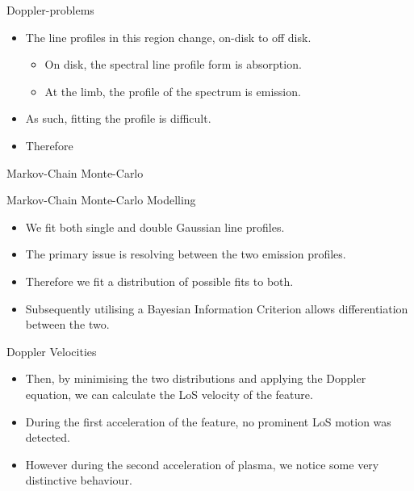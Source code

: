 \documentclass{beamer}
\begin{document}
	\begin{frame}
		\big {}
	\end{frame}

	\begin{frame}{Doppler-problems}
		\begin{itemize}
			\item{The line profiles in this region change, on-disk to off disk.}
			\begin{itemize}
				\item{On disk, the spectral line profile form is absorption.}
				\item{At the limb, the profile of the spectrum is emission.}
			\end{itemize}
			\item{As such, fitting the profile is difficult.}
			\item{Therefore}
		\end{itemize}
	\end{frame}
	
	\begin{frame}
		\big Markov-Chain Monte-Carlo
	\end{frame}
	
	
	\begin{frame}{Markov-Chain Monte-Carlo Modelling}
		\begin{itemize}
			\item{We fit both single and double Gaussian line profiles.}
			\item{The primary issue is resolving between the two emission profiles.}
			\item{Therefore we fit a distribution of possible fits to both.}
			\item{Subsequently utilising a Bayesian Information Criterion allows differentiation between the two.}
		\end{itemize}
	\end{frame}

	\begin{frame}{Doppler Velocities}
		\begin{itemize}
			\item{Then, by minimising the two distributions and applying the Doppler equation, we can calculate the LoS velocity of the feature.}
			\item{During the first acceleration of the feature, no prominent LoS motion was detected.}
			\item{However during the second acceleration of plasma, we notice some very distinctive behaviour.}
		\end{itemize}
	\end{frame}
\end{document}
